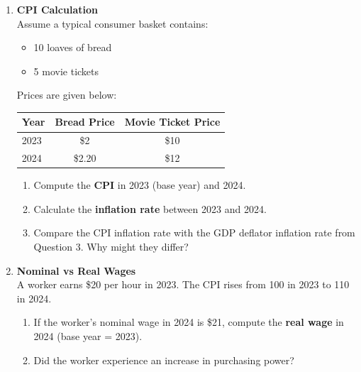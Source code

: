 \documentclass[12pt]{article}
\begin{document}
\begin{enumerate}[resume]

\item \textbf{CPI Calculation} \\
Assume a typical consumer basket contains:  
\begin{itemize}
    \item 10 loaves of bread  
    \item 5 movie tickets  
\end{itemize}

Prices are given below:  

\begin{center}
\begin{tabular}{lcc}
\toprule
Year & Bread Price & Movie Ticket Price \\
\midrule
2023 & \$2 & \$10 \\
2024 & \$2.20 & \$12 \\
\bottomrule
\end{tabular}
\end{center}

\begin{enumerate}[label=(\alph*)]
    \item Compute the \textbf{CPI} in 2023 (base year) and 2024.  
    \item Calculate the \textbf{inflation rate} between 2023 and 2024.  
    \item Compare the CPI inflation rate with the GDP deflator inflation rate from Question 3. Why might they differ?  
\end{enumerate}

\item \textbf{Nominal vs Real Wages} \\
A worker earns \$20 per hour in 2023. The CPI rises from 100 in 2023 to 110 in 2024.  

\begin{enumerate}[label=(\alph*)]
    \item If the worker’s nominal wage in 2024 is \$21, compute the \textbf{real wage} in 2024 (base year = 2023).  
    \item Did the worker experience an increase in purchasing power?  
\end{enumerate}

\end{enumerate}
\end{document}

